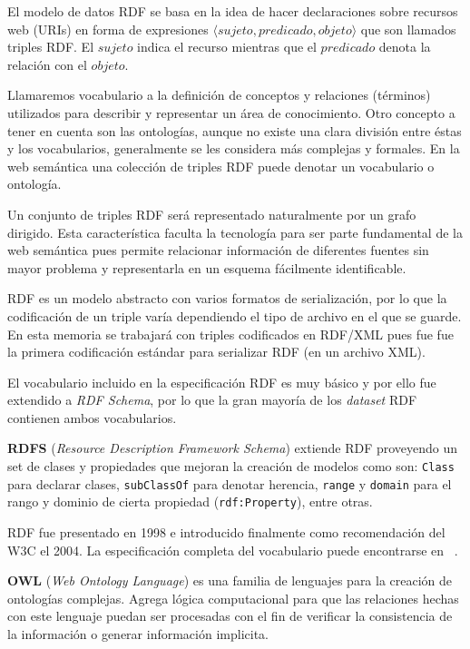 \documentclass[spanish, fleqn, twocolumn]{IEEEtran/IEEEtran}
\renewcommand{\tt}[1]{\texttt{#1}}
\renewcommand{\bf}[1]{\textbf{#1}}
\begin{document}
El modelo de datos RDF se basa en la idea de hacer declaraciones sobre 
recursos web (URIs) en forma de expresiones $\langle sujeto, predicado, objeto
\rangle$ que son llamados triples RDF.
El $sujeto$ indica el recurso mientras que el $predicado$ denota la relación
con el $objeto$.

Llamaremos vocabulario a la definición de conceptos y relaciones (términos)
utilizados para describir y representar un área de conocimiento.
Otro concepto a tener en cuenta son las ontologías, aunque no existe una clara 
división entre éstas y los vocabularios, generalmente se les considera más
complejas y formales.
En la web semántica una colección de triples RDF puede denotar un vocabulario o
ontología.

Un conjunto de triples RDF será representado naturalmente por un grafo dirigido.
Esta característica faculta la tecnología para ser parte fundamental de la web 
semántica pues permite relacionar información de diferentes fuentes sin mayor
problema y representarla en un esquema fácilmente identificable.

RDF es un modelo abstracto con varios formatos de serialización, por lo que la
codificación de un triple varía dependiendo el tipo de archivo en el que se
guarde. En esta memoria se trabajará con triples codificados en RDF/XML pues
fue fue la primera codificación estándar para serializar RDF (en un archivo
XML).

El vocabulario incluido en la especificación RDF es muy básico y por ello fue
extendido a \emph{RDF Schema}, por lo que la gran mayoría de los \emph{dataset}
RDF contienen ambos vocabularios.

\bf{RDFS} (\emph{Resource Description Framework Schema}) extiende RDF proveyendo
un set de clases y propiedades que mejoran la creación de modelos como son:
\tt{Class} para declarar clases, \tt{subClassOf} para denotar herencia,
\tt{range} y \tt{domain} para el rango y dominio de cierta propiedad
(\tt{rdf:Property}), entre otras.

RDF fue presentado en 1998 e introducido finalmente como recomendación del W3C
el 2004\cite{bikakis2013semantic}. La especificación completa del vocabulario puede encontrarse en ~\cite{brickley2014rdfs}.

\bf{OWL} (\emph{Web Ontology Language}) es una familia de lenguajes para
la creación de ontologías complejas.
Agrega lógica computacional para que las relaciones
hechas con este lenguaje puedan ser procesadas con el fin de verificar la
consistencia de la información o generar información implicita.
\end{document}
